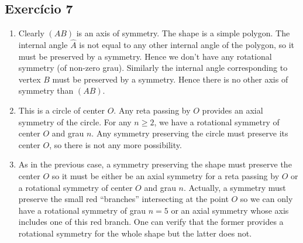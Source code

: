 \subsection*{Exercício 7}

\begin{enumerate}
\item
  Clearly $(AB)$ is an axis of symmetry.
  The shape is a simple polygon.
  The internal angle $\widehat{A}$ is not equal to any
  other internal angle of the polygon, so it must be preserved by a symmetry.
  Hence we don't have any rotational symmetry (of non-zero grau). Similarly the
  internal angle corresponding to vertex $B$ must be preserved by a symmetry.
  Hence there is no other axis of symmetry than $(AB)$.
  
  
  \item This is a circle of center $O$. Any reta passing by $O$
    provides an axial symmetry of the circle.
    For any $n \geq 2$, we have a rotational symmetry of center
    $O$ and grau $n$.
    Any symmetry preserving the circle must preserve its center $O$,
    so there is not any more possibility.
    

  \item As in the previous case, a symmetry preserving the shape must preserve
    the center $O$ so it must be either be an axial symmetry
    for a reta passing by $O$ or a rotational symmetry of center
    $O$ and grau $n$. Actually, a symmetry must preserve the small
    red ``branches''  intersecting at the point $O$ so we can only
    have a rotational symmetry of grau $n = 5$ or an axial symmetry
    whose axis includes one of this red branch. One can verify that the former
    provides a rotational symmetry for the whole shape but the latter does not.


\end{enumerate}
